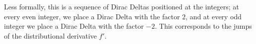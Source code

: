 \documentclass[11pt]{article}
\begin{document}
\begin{solution}
	Less formally, this is a sequence of Dirac Deltas positioned at the integers;
	at every even integer, we place a Dirac Delta with the factor $2$, and at every odd integer we place a Dirac Delta with the factor $-2$. This corresponds to the jumps of the distributional derivative $f'$.
\end{solution}
\end{document}
